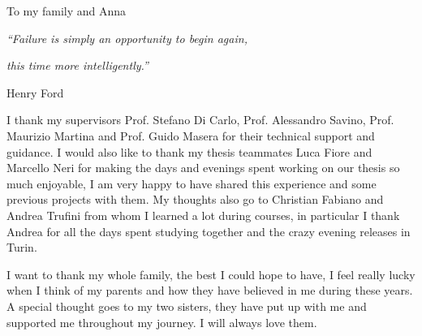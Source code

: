 \documentclass[corpo=11pt,english,numerazioneromana]{toptesi}
\begin{document}
\frontespizio




\frontmatter

\begin{flushright}
\noindent
To my family and Anna
\end{flushright}
\cleardoublepage

\begin{flushright}
\noindent
\textit{“Failure is simply an opportunity to begin again, }

\textit{this time more intelligently.”}


Henry Ford

\end{flushright}
\cleardoublepage


\ringraziamenti
I thank my supervisors Prof. Stefano Di Carlo, Prof. Alessandro Savino, Prof. Maurizio Martina and Prof. Guido Masera for their technical support and
guidance. I would also like to thank my thesis teammates Luca Fiore and Marcello Neri for making the days and evenings spent working on our thesis so much enjoyable, I am very happy to have shared this experience and some previous projects with them. My thoughts also go to Christian Fabiano and Andrea Trufini from whom I learned a lot during courses, in particular I thank Andrea for all the days spent studying together and the crazy evening releases in Turin. 


I want to thank my whole family, the best I could hope to have, I feel really lucky when I think of my parents and how they have believed in me during these years. A special thought goes to my two sisters, they have put up with me and supported me throughout my journey. I will always love them. 
\end{document}
